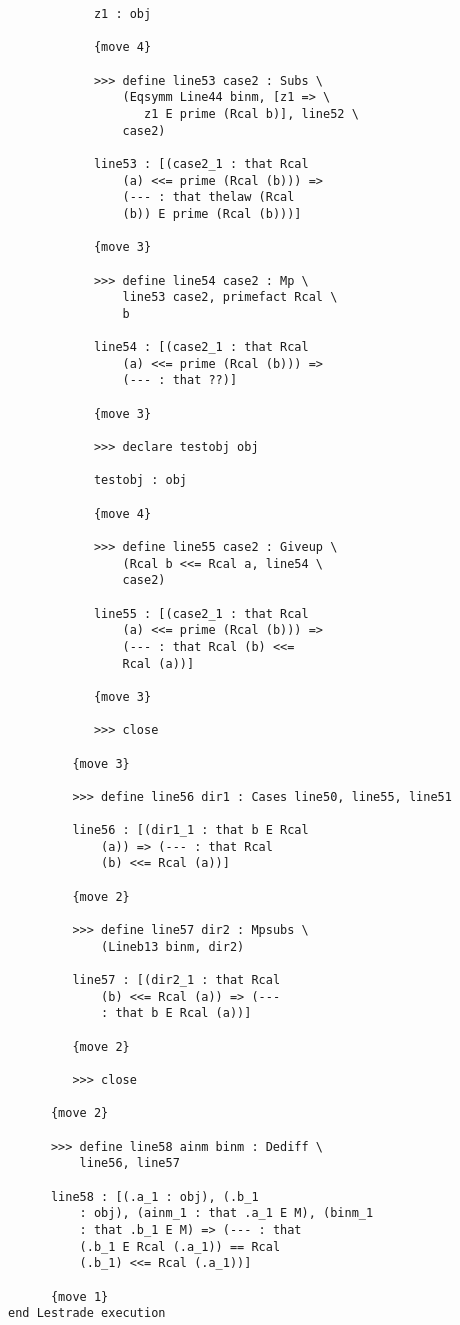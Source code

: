 \documentclass[12pt]{article}
\begin{document}
\begin{verbatim}
            z1 : obj

            {move 4}

            >>> define line53 case2 : Subs \
                (Eqsymm Line44 binm, [z1 => \
                   z1 E prime (Rcal b)], line52 \
                case2)

            line53 : [(case2_1 : that Rcal 
                (a) <<= prime (Rcal (b))) => 
                (--- : that thelaw (Rcal 
                (b)) E prime (Rcal (b)))]

            {move 3}

            >>> define line54 case2 : Mp \
                line53 case2, primefact Rcal \
                b

            line54 : [(case2_1 : that Rcal 
                (a) <<= prime (Rcal (b))) => 
                (--- : that ??)]

            {move 3}

            >>> declare testobj obj

            testobj : obj

            {move 4}

            >>> define line55 case2 : Giveup \
                (Rcal b <<= Rcal a, line54 \
                case2)

            line55 : [(case2_1 : that Rcal 
                (a) <<= prime (Rcal (b))) => 
                (--- : that Rcal (b) <<= 
                Rcal (a))]

            {move 3}

            >>> close

         {move 3}

         >>> define line56 dir1 : Cases line50, line55, line51

         line56 : [(dir1_1 : that b E Rcal 
             (a)) => (--- : that Rcal 
             (b) <<= Rcal (a))]

         {move 2}

         >>> define line57 dir2 : Mpsubs \
             (Lineb13 binm, dir2)

         line57 : [(dir2_1 : that Rcal 
             (b) <<= Rcal (a)) => (--- 
             : that b E Rcal (a))]

         {move 2}

         >>> close

      {move 2}

      >>> define line58 ainm binm : Dediff \
          line56, line57

      line58 : [(.a_1 : obj), (.b_1 
          : obj), (ainm_1 : that .a_1 E M), (binm_1 
          : that .b_1 E M) => (--- : that 
          (.b_1 E Rcal (.a_1)) == Rcal 
          (.b_1) <<= Rcal (.a_1))]

      {move 1}
end Lestrade execution
\end{verbatim}
\end{document}
